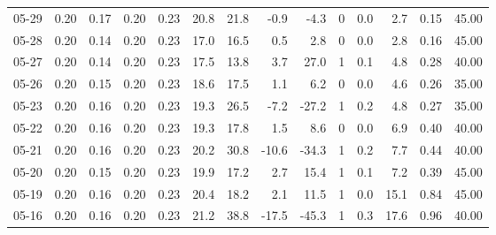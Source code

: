 \begin{threeparttable}
{\begin{tabular}{lrrrrrrrrrrrrr}
  05-29 &          0.20 &          0.17 &          0.20 &        0.23 &                20.8 &                21.8 &       -0.9 &         -4.3 &              0 &                 0.0 &              2.7 &            0.15 &                  45.00 \\
  05-28 &          0.20 &          0.14 &          0.20 &        0.23 &                17.0 &                16.5 &        0.5 &          2.8 &              0 &                 0.0 &              2.8 &            0.16 &                  45.00 \\
  05-27 &          0.20 &          0.14 &          0.20 &        0.23 &                17.5 &                13.8 &        3.7 &         27.0 &              1 &                 0.1 &              4.8 &            0.28 &                  40.00 \\
  05-26 &          0.20 &          0.15 &          0.20 &        0.23 &                18.6 &                17.5 &        1.1 &          6.2 &              0 &                 0.0 &              4.6 &            0.26 &                  35.00 \\
  05-23 &          0.20 &          0.16 &          0.20 &        0.23 &                19.3 &                26.5 &       -7.2 &        -27.2 &              1 &                 0.2 &              4.8 &            0.27 &                  35.00 \\
  05-22 &          0.20 &          0.16 &          0.20 &        0.23 &                19.3 &                17.8 &        1.5 &          8.6 &              0 &                 0.0 &              6.9 &            0.40 &                  40.00 \\
  05-21 &          0.20 &          0.16 &          0.20 &        0.23 &                20.2 &                30.8 &      -10.6 &        -34.3 &              1 &                 0.2 &              7.7 &            0.44 &                  40.00 \\
  05-20 &          0.20 &          0.15 &          0.20 &        0.23 &                19.9 &                17.2 &        2.7 &         15.4 &              1 &                 0.1 &              7.2 &            0.39 &                  45.00 \\
  05-19 &          0.20 &          0.16 &          0.20 &        0.23 &                20.4 &                18.2 &        2.1 &         11.5 &              1 &                 0.0 &             15.1 &            0.84 &                  45.00 \\
  05-16 &          0.20 &          0.16 &          0.20 &        0.23 &                21.2 &                38.8 &      -17.5 &        -45.3 &              1 &                 0.3 &             17.6 &            0.96 &                  40.00 \\

\end{tabular}}
\end{threeparttable}

